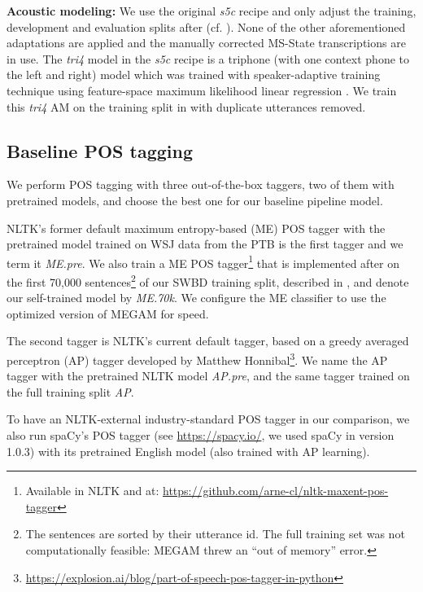 \documentclass[11pt,letterpaper]{article}
\begin{document}
\textbf{Acoustic modeling:} 
We use the original \emph{s5c} recipe and only adjust the training, development and evaluation splits after \citet{CharniakJohnson:2001} (cf. ). None of the other aforementioned adaptations are applied and the manually corrected MS-State transcriptions are in use. 
The \emph{tri4} model in the \emph{s5c} recipe is a triphone (with one context phone to the left and right) model which was trained with speaker-adaptive training \citep[SAT,~][]{AnastasakosEtal:1996,PoveyEtal:2008sat} technique using feature-space maximum likelihood linear regression \citep[fMLLR,~][]{Gales:1998}.
We train this \emph{tri4} AM on the training split in  with duplicate utterances removed.

\subsection{Baseline POS tagging}\label{ssec:pos}
We perform POS tagging with three out-of-the-box taggers, two of them with pretrained models, and choose the best one for our baseline pipeline model.

NLTK's \citep{BirdEtal:2009} former default maximum entropy-based (ME) POS tagger with the pretrained model trained on WSJ data from the PTB \citep[for an overview, see][]{TaylorEtal:2003} is the first tagger and we term it \emph{ME.pre}. We also train a ME POS tagger\footnote{Available in NLTK and at: \url{https://github.com/arne-cl/nltk-maxent-pos-tagger}} that is implemented after \citet{Ratnaparkhi:1996} on the first 70,000 sentences\footnote{The sentences are sorted by their utterance id. The full training set was not computationally feasible: MEGAM threw an ``out of memory'' error.} of our SWBD training split, described in , and denote our self-trained model by \emph{ME.70k}. We configure the ME classifier to use the optimized version of MEGAM \citep{Daume:2004} for speed.

The second tagger is NLTK's current default tagger, based on a greedy averaged perceptron (AP) tagger developed by Matthew Honnibal\footnote{\url{https://explosion.ai/blog/part-of-speech-pos-tagger-in-python}}. We name the AP tagger with the pretrained NLTK model \emph{AP.pre}, and the same tagger trained on the full training split \emph{AP}.

To have an NLTK-external industry-standard POS tagger in our comparison, we also run spaCy's POS tagger (see \url{https://spacy.io/}, we used spaCy in version 1.0.3) with its pretrained English model (also trained with AP learning).
\end{document}
